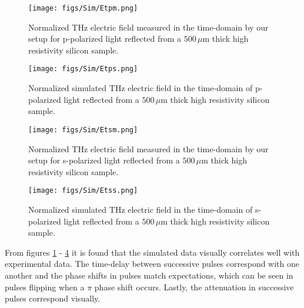 \begin{figure}[H]
\begin{center}
\texttt{[image: figs/Sim/Etpm.png]}
\end{center}
\caption[Measured p-polarized terahertz electric field in time for high resistivity silicon]{\label{fig:EpM} Normalized THz electric field measured in the time-domain by our setup for p-polarized light reflected from a $500\,\mu$m thick high resistivity silicon sample.}
\end{figure}

\begin{figure}[H]
\begin{center}
\texttt{[image: figs/Sim/Etps.png]}
\end{center}
\caption[Simulated p-polarized terahertz electric field in time for high resistivity silicon]{\label{fig:EpS} Normalized simulated THz electric field in the time-domain of p-polarized light reflected from a $500\,\mu$m thick high resistivity silicon sample.}
\end{figure}

\begin{figure}[H]
\begin{center}
\texttt{[image: figs/Sim/Etsm.png]}
\end{center}
\caption[Measured s-polarized terahertz electric field in time for high resistivity silicon]{\label{fig:EsM} Normalized THz electric field measured in the time-domain by our setup for s-polarized light reflected from a $500\,\mu$m thick high resistivity silicon sample.}
\end{figure}

\begin{figure}[H]
\begin{center}
\texttt{[image: figs/Sim/Etss.png]}
\end{center}
\caption[Simulated s-polarized terahertz electric field in time for high resistivity silicon]{\label{fig:EsS} Normalized simulated THz electric field in the time-domain of s-polarized light reflected from a $500\,\mu$m thick high resistivity silicon sample.}
\end{figure}

From figures \ref{fig:EpM} - \ref{fig:EsS} it is found that the simulated data visually correlates well with experimental data. The time-delay between successive pulses correspond with one another and the phase shifts in pulses match expectations, which can be seen in pulses flipping when a $\pi$ phase shift occurs. Lastly, the attenuation in successive pulses correspond visually. 

